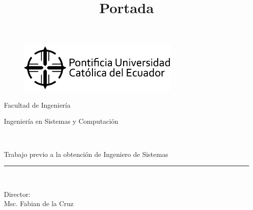 \title{Portada}
\begin{titlepage}
	\begin{center}
		\vspace*{-1in}
		\begin{figure}[htb]
			\begin{center}
				\includegraphics[width=8cm]{./logos/puce.png}
			\end{center}
		\end{figure}
		Facultad de Ingeniería\\
		\vspace*{0.18in}
		\vspace*{0.6in}
		\begin{large}
			Ingeniería en Sistemas y Computación\\
		\end{large}
		\vspace*{0.2in}
		\begin{Large}
			\textbf{\tituloTesis} \\
		\end{Large}
		\vspace*{0.3in}
		\begin{large}
			Trabajo previo a la obtención de Ingeniero de Sistemas\\
		\end{large}
		\vspace*{0.3in}
		\rule{80mm}{0.1mm}\\
		\vspace*{0.1in}
		
		\begin{large}
			Director: \\
			Msc. Fabian de la Cruz \\
		\end{large}
	\end{center}
\end{titlepage}